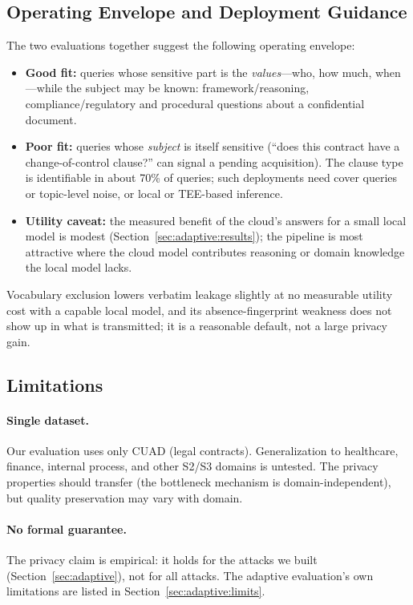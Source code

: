 \documentclass[sigconf,balance=false]{acmart}
\begin{document}
\subsection{Operating Envelope and Deployment Guidance}
\label{sec:envelope}

The two evaluations together suggest the following operating envelope:

\begin{itemize}
\item \textbf{Good fit:} queries whose sensitive part is the \emph{values}---who, how much, when---while the subject may be known: framework/reasoning, compliance/regulatory and procedural questions about a confidential document.
\item \textbf{Poor fit:} queries whose \emph{subject} is itself sensitive (``does this contract have a change-of-control clause?'' can signal a pending acquisition). The clause type is identifiable in about 70\% of queries; such deployments need cover queries or topic-level noise, or local or TEE-based inference.
\item \textbf{Utility caveat:} the measured benefit of the cloud's answers for a small local model is modest (Section~\ref{sec:adaptive:results}); the pipeline is most attractive where the cloud model contributes reasoning or domain knowledge the local model lacks.
\end{itemize}

Vocabulary exclusion lowers verbatim leakage slightly at no measurable utility cost with a capable local model, and its absence-fingerprint weakness does not show up in what is transmitted; it is a reasonable default, not a large privacy gain.

\subsection{Limitations}
\label{sec:limitations}

\paragraph{Single dataset.} Our evaluation uses only CUAD (legal contracts). Generalization to healthcare, finance, internal process, and other S2/S3 domains is untested. The privacy properties should transfer (the bottleneck mechanism is domain-independent), but quality preservation may vary with domain.

\paragraph{No formal guarantee.} The privacy claim is empirical: it holds for the attacks we built (Section~\ref{sec:adaptive}), not for all attacks. The adaptive evaluation's own limitations are listed in Section~\ref{sec:adaptive:limits}.
\end{document}
